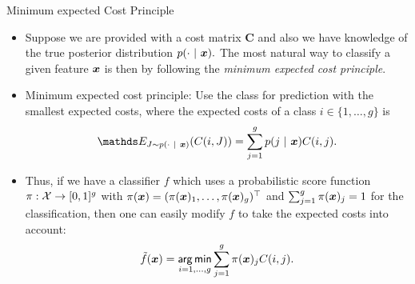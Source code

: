 \begin{vbframe}{Minimum expected Cost Principle}
	\footnotesize{

		\begin{itemize}\footnotesize
			\item Suppose we are provided with a cost matrix $\mathbf{C}$ and also we have knowledge of the true posterior distribution $p(\cdot ~|~ \bm{x}).$ The most natural way to classify a given feature $\bm{x}$ is then by following the \emph{minimum expected cost principle}.
%			
			\item Minimum expected cost principle: Use the class for prediction with the smallest expected costs, where the expected costs of a class $i\in\{1,\ldots,g\}$ is
%			
			$$ 	\E_{J \sim p(\cdot ~|~ \xv)}( C(i,J) ) = \sum_{j=1}^g 	p(j ~|~ \xv) C(i,j).	$$
			\item Thus, if we have a classifier $f$ which uses a probabilistic score function $\pi:\mathcal{X} \to [0,1]^g$ with $\pi(\bm{x}) = (\pi(\bm{x})_1,\ldots,\pi(\bm{x})_g)^\top$ and $\sum_{j=1}^g \pi(\bm{x})_j = 1$ for the classification, then one can easily modify $f$ to take the expected costs into account:
%			
			$$  \tilde f (\bm{x}) = \mathop{\sf arg\,min}_{i=1,\ldots,g} \sum_{j=1}^g 	\pi(\bm{x})_j C(i,j). $$
%					
		\end{itemize}
	}
\end{vbframe}


